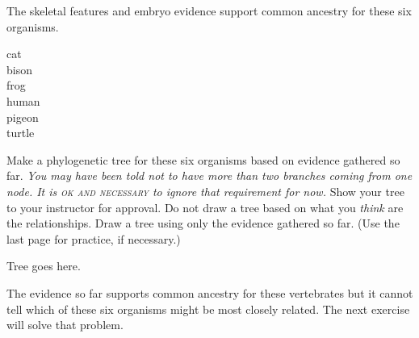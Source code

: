 \documentclass[12pt, hidelinks]{exam}
\newcommand*\AnswerBox[2]{%
    \parbox[t][#1]{0.92\textwidth}{%
    \begin{solution}#2\end{solution}}
    \vspace{\stretch{1}}
}
\begin{document}
\begin{questions}
\question
The skeletal features and embryo evidence support common ancestry for these six organisms. 

\begin{multicols}{3}

	cat \\
	bison \\
	frog \\
	human \\
	pigeon \\
	turtle 
		
\end{multicols}

Make a phylogenetic tree for these six organisms based on evidence gathered so far. \emph{You may have been told not to have more than two branches coming from one node. It is \textsc{ok and necessary} to ignore that requirement for now.} Show your tree to your instructor for approval. Do not draw a tree based on what you \emph{think} are the relationships. Draw a tree using only the evidence gathered so far. (Use the last page for practice, if necessary.)

\AnswerBox{0.45\textheight}{Tree goes here.}

\end{questions}

The evidence so far supports common ancestry for these vertebrates but it cannot tell which of these six organisms might be most closely related. The next exercise will solve that problem.
\end{document}
